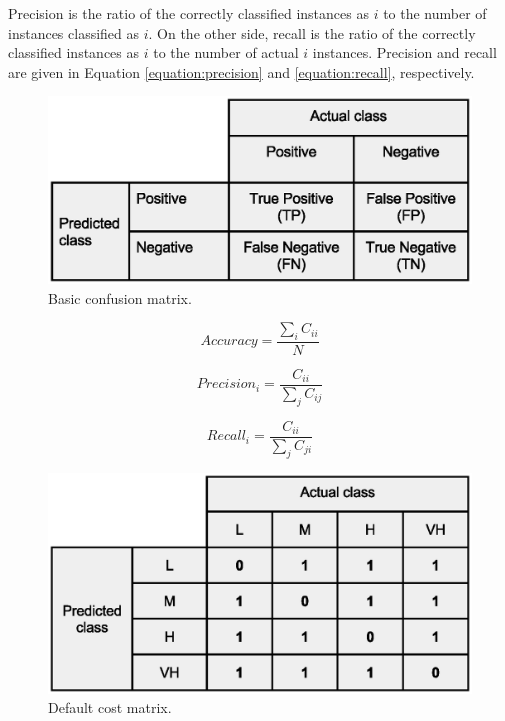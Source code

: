 \documentclass[a4paper,10pt,twocolumn,preprint,3p]{elsarticle}
\begin{document}
Precision is the ratio of the correctly classified instances as $i$ to the number of instances classified as $i$. On the other side, recall is the ratio of the correctly classified instances as $i$ to the number of actual $i$ instances. Precision and recall are given in Equation \ref{equation:precision} and \ref{equation:recall}, respectively.


\begin{figure}[ht]
\begin{center}
\includegraphics[scale=0.50]{Confusion-matrix}
\end{center}
\caption{Basic confusion matrix.}
\label{fig:confusionmatrix}
\end{figure}

\begin{equation}
Accuracy=\frac{\sum_{i}C_{ii}}{N}
\label{equation:acc}
\end{equation}


\begin{equation}
Precision_{i}=\frac{C_{ii}}{\sum_{j}C_{ij}}
\label{equation:precision}
\end{equation}


\begin{equation}
Recall_{i}=\frac{C_{ii}}{\sum_{j}C_{ji}}
\label{equation:recall}
\end{equation}

\begin{figure}[ht]
\begin{center}
\includegraphics[scale=0.40]{Confusion-matrix-multiclass-default}
\end{center}
\caption{Default cost matrix.}
\label{fig:Default_cost_matrix}
\end{figure}
\end{document}
